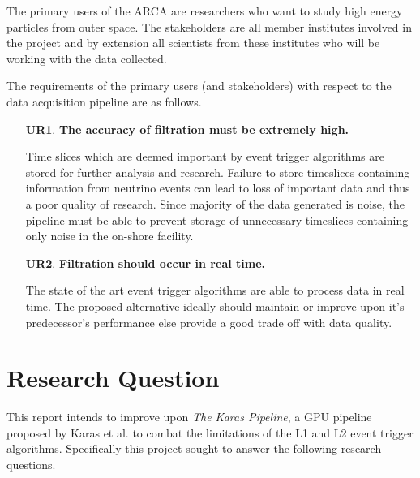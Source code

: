 The primary users of the ARCA are researchers who want to study high energy
particles from outer space. The stakeholders are all member institutes involved
in the project and by extension all scientists from these institutes who will
be working with the data collected.

The requirements of the primary users (and stakeholders) with respect to the
data acquisition pipeline are as follows.

\begin{enumerate}
  \item[\textbf{UR1}.]\textbf{The accuracy of filtration must be extremely high.}

    Time slices which are deemed important by event trigger algorithms
    are stored for further analysis and research. Failure to store
    timeslices containing information from neutrino events can lead to
    loss of important data and thus a poor quality of research. Since
    majority of the data generated is noise, the pipeline must be able
    to prevent storage of unnecessary timeslices containing only noise
    in the on-shore facility.

  \item[\textbf{UR2}.] \textbf{Filtration should occur in real time.}

    The state of the art event trigger algorithms are able to process
    data in real time. The proposed alternative ideally should
    maintain or improve upon it's predecessor's performance else
    provide a good trade off with data quality.

\end{enumerate}

\section{Research Question}
\label{sec:rqs}

This report intends to improve upon \emph{The Karas Pipeline}, a GPU
pipeline proposed by Karas et al. to combat the limitations of the L1
and L2 event trigger algorithms. Specifically this project sought to
answer the following research questions.

